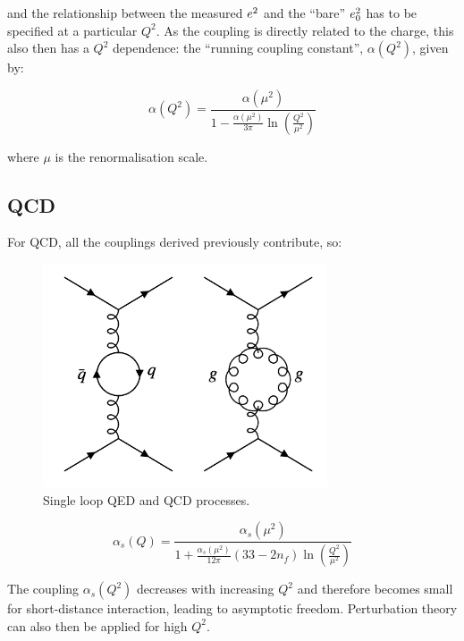 and the relationship between the measured $e^2$ and the ``bare'' $e^2_0$ has to be specified at a particular $Q^2$.  As the coupling is directly related to the charge, this also then has a $Q^2$ dependence: the ``running coupling constant'', $\alpha(Q^2)$, given by:

\[
  \alpha(Q^2) = \frac{\alpha(\mu^2)}{1 - \frac{\alpha(\mu^2)}{3\pi}\ln\left(\frac{Q^2}{\mu^2}\right)}
\]

where $\mu$ is the renormalisation scale.

\subsection{QCD}

For QCD, all the couplings derived previously contribute, so:

\begin{figure}[!htb]
  \begin{center}
    \includegraphics[width=0.75\textwidth]{images/web_feynman/image_82.png}
    \caption[Single loop QED and QCD processes]{Single loop QED and QCD processes.}
    \label{fig:ch15_loopQEDQCD}
  \end{center}
\end{figure}

\[
  \alpha_s(Q) = \frac{\alpha_s(\mu^2)}{1 + \frac{\alpha_s(\mu^2)}{12\pi}\left(33 - 2n_f\right)\ln\left(\frac{Q^2}{\mu^2}\right)}
\]

The coupling $\alpha_s(Q^2)$ decreases with increasing $Q^2$ and therefore becomes small for short-distance interaction, leading to asymptotic freedom.  Perturbation theory can also then be applied for high $Q^2$.
